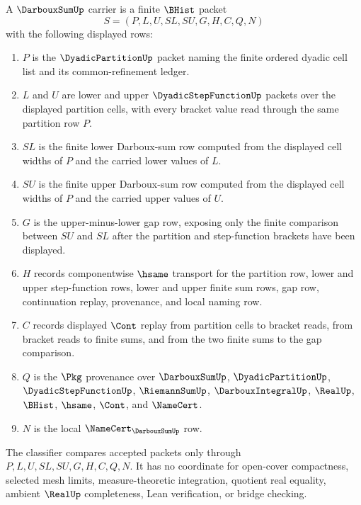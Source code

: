 \begin{definition}\label{def:darboux-sum-carrier}
A $\DarbouxSumUp$ carrier is a finite $\BHist$ packet
$$
S=(P,L,U,SL,SU,G,H,C,Q,N)
$$
with the following displayed rows:
\begin{enumerate}
\item $P$ is the $\DyadicPartitionUp$ packet naming the finite ordered dyadic cell list and its common-refinement ledger.
\item $L$ and $U$ are lower and upper $\DyadicStepFunctionUp$ packets over the displayed partition cells, with every bracket value read through the same partition row $P$.
\item $SL$ is the finite lower Darboux-sum row computed from the displayed cell widths of $P$ and the carried lower values of $L$.
\item $SU$ is the finite upper Darboux-sum row computed from the displayed cell widths of $P$ and the carried upper values of $U$.
\item $G$ is the upper-minus-lower gap row, exposing only the finite comparison between $SU$ and $SL$ after the partition and step-function brackets have been displayed.
\item $H$ records componentwise $\hsame$ transport for the partition row, lower and upper step-function rows, lower and upper finite sum rows, gap row, continuation replay, provenance, and local naming row.
\item $C$ records displayed $\Cont$ replay from partition cells to bracket reads, from bracket reads to finite sums, and from the two finite sums to the gap comparison.
\item $Q$ is the $\Pkg$ provenance over $\DarbouxSumUp$, $\DyadicPartitionUp$, $\DyadicStepFunctionUp$, $\RiemannSumUp$, $\DarbouxIntegralUp$, $\RealUp$, $\BHist$, $\hsame$, $\Cont$, and $\NameCert$.
\item $N$ is the local $\NameCert_{\DarbouxSumUp}$ row.
\end{enumerate}
The classifier compares accepted packets only through $P,L,U,SL,SU,G,H,C,Q,N$. It has no coordinate for open-cover compactness, selected mesh limits, measure-theoretic integration, quotient real equality, ambient $\RealUp$ completeness, Lean verification, or bridge checking.
\end{definition}


